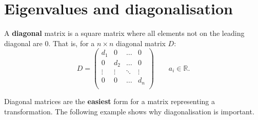 \chapter{Eigenvalues and diagonalisation}

\begin{definition}
    A \textbf{diagonal} matrix is a square matrix where all elements not on the leading diagonal are $0$. That is, for a $n \times n$ diagonal matrix $D$:
    \[
        D =
        \begin{pmatrix}
            d_1 & 0 & \ldots & 0 \\
            0 & d_2 & \ldots & 0 \\
            \vdots & \vdots & \ddots & \vdots \\
            0 & 0 & \ldots & d_n \\
        \end{pmatrix}
        \qquad a_i \in \mathbb{R}.
    \]
\end{definition}

Diagonal matrices are the \textbf{easiest} form for a matrix representing a transformation. The following example shows why diagonalisation is important.

